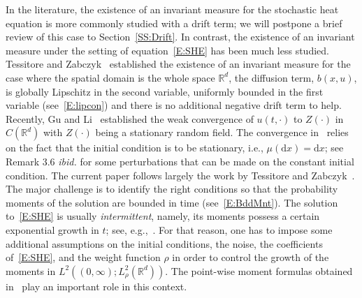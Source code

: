 \documentclass[a4paper,11pt]{article}%
\theoremstyle{plain}
\theoremstyle{definition}
\numberwithin{equation}{section}
\newcommand{\R}{\mathbb{R}}
\newcommand{\ud}{\ensuremath{\mathrm{d}}}
\begin{document}
In the literature, the existence of an invariant measure for the stochastic heat equation is more
commonly studied with a drift term; we will postpone a brief review of this case to
Section~\ref{SS:Drift}. In contrast, the existence of an invariant measure under the setting of
equation~\eqref{E:SHE} has been much less studied. Tessitore and
Zabczyk~\cite{tessitore.zabczyk:98:invariant} established the existence of an invariant measure for the
case where the spatial domain is the whole space $\R^d$, the diffusion term, $b(x,u)$, is globally
Lipschitz in the second variable, uniformly bounded in the first variable (see~\eqref{E:lipcon}) and
there is no additional negative drift term to help. Recently, Gu and Li~\cite{gu.li:20:fluctuations}
established the weak convergence of $u(t,\cdot)$ to $Z(\cdot)$ in $C(\R^d)$ with $Z(\cdot)$ being a
stationary random field. The convergence in~\cite{gu.li:20:fluctuations} relies on the fact that the
initial condition is to be stationary, i.e., $\mu(\ud x) = \ud x$; see Remark 3.6 {\it ibid.} for some
perturbations that can be made on the constant initial condition. The current paper follows largely
the work by Tessitore and Zabczyk~\cite{tessitore.zabczyk:98:invariant}. The major challenge is to
identify the right conditions so that the probability moments of the solution are bounded in time
(see~\eqref{E:BddMnt}). The solution to~\eqref{E:SHE} is usually \textit{intermittent}, namely, its
moments possess a certain exponential growth in $t$; see,
e.g.,~\cite{carmona.molchanov:94:parabolic,foondun.khoshnevisan:09:intermittence}. For that reason,
one has to impose some additional assumptions on the initial conditions, the noise, the coefficients
of~\eqref{E:SHE}, and the weight function $\rho$ in order to control the growth of the moments in
$L^2\left((0,\infty); L_\rho^2(\R^d)\right)$. The point-wise moment formulas obtained
in~\cite{chen.huang:19:comparison,chen.kim:19:nonlinear} play an important role in this context.
\end{document}
